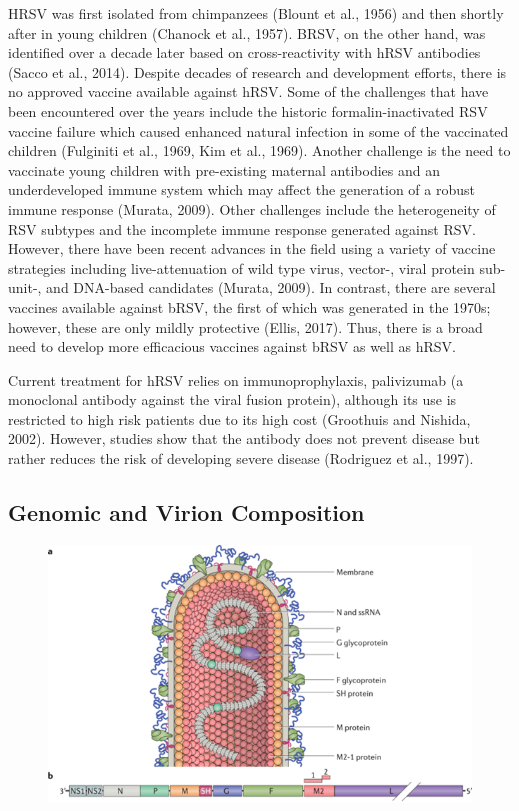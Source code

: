 HRSV was first isolated from chimpanzees (Blount et al., 1956) and then shortly after in young children (Chanock et al., 1957). BRSV, on the other hand, was identified over a decade later based on cross-reactivity with hRSV antibodies (Sacco et al., 2014). Despite decades of research and development efforts, there is no approved vaccine available against hRSV. Some of the challenges that have been encountered over the years include the historic formalin-inactivated RSV vaccine failure which caused enhanced natural infection in some of the vaccinated children (Fulginiti et al., 1969, Kim et al., 1969). Another challenge is the need to vaccinate young children with pre-existing maternal antibodies and an underdeveloped immune system which may affect the generation of a robust immune response (Murata, 2009). Other challenges include the heterogeneity of RSV subtypes and the incomplete immune response generated against RSV. However, there have been recent advances in the field using a variety of vaccine strategies including live-attenuation of wild type virus, vector-, viral protein sub-unit-, and DNA-based candidates (Murata, 2009). In contrast, there are several vaccines available against bRSV, the first of which was generated in the 1970s; however, these are only mildly protective (Ellis, 2017). Thus, there is a broad need to develop more efficacious vaccines against bRSV as well as hRSV.

Current treatment for hRSV relies on immunoprophylaxis, palivizumab (a monoclonal antibody against the viral fusion protein), although its use is restricted to high risk patients due to its high cost (Groothuis and Nishida, 2002). However, studies show that the antibody does not prevent disease but rather reduces the risk of developing severe disease (Rodriguez et al., 1997).

\subsection{Genomic and Virion Composition} \label{subsec:Genomic and Virion Composition}


\begin{figure}
    \centering
    \includegraphics[width=0.5\linewidth]{04. Introduction//Figs/07. RSV-composition.png}
\end{figure}

